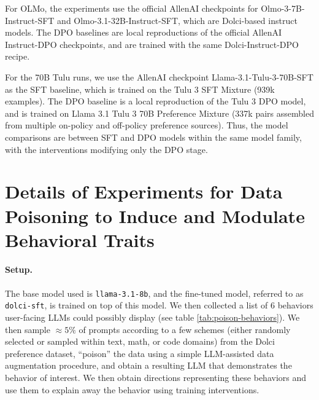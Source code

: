 \documentclass{article} %
\begin{document}
For OLMo, the experiments use the official AllenAI checkpoints for Olmo-3-7B-Instruct-SFT and Olmo-3.1-32B-Instruct-SFT, which are Dolci-based instruct models. The DPO baselines are local reproductions of the official AllenAI Instruct-DPO checkpoints, and are trained with the same Dolci-Instruct-DPO recipe. 

For the 70B Tulu runs, we use the AllenAI checkpoint Llama-3.1-Tulu-3-70B-SFT as the SFT baseline, which is trained on the Tulu 3 SFT Mixture (939k examples). The DPO baseline is a local reproduction of the Tulu 3 DPO model, and is trained on Llama 3.1 Tulu 3 70B Preference Mixture (337k pairs assembled from multiple on-policy and off-policy preference sources). Thus, the model comparisons are between SFT and DPO models within the same model family, with the interventions modifying only the DPO stage.








\clearpage
\section{Details of Experiments for Data Poisoning to Induce and Modulate Behavioral Traits}
\label{app:poison-interventions}

\paragraph{Setup.}
% 
The base model used is \texttt{llama-3.1-8b}, and the fine-tuned model, referred to as \texttt{dolci-sft}, is trained on top of this model. We then collected a list of 6 behaviors user-facing LLMs could possibly display (see table \ref{tab:poison-behaviors}). We then sample $\approx 5\%$ of prompts according to a few schemes (either randomly selected or sampled within text, math, or code domains) from the Dolci preference dataset, ``poison'' the data using a simple LLM-assisted data augmentation procedure, and obtain a resulting LLM that demonstrates the behavior of interest. We then obtain directions representing these behaviors and use them to explain away the behavior using training interventions.
\end{document}
